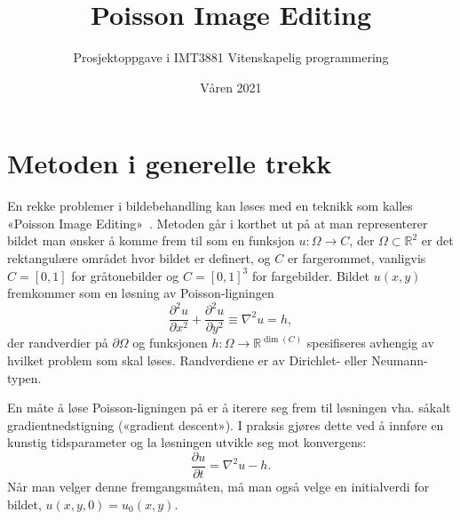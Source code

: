 \documentclass[11pt,a4paper]{article}
\begin{document}
\title{Poisson Image Editing}
\author{Prosjektoppgave i IMT3881 Vitenskapelig programmering}
\date{Våren 2021}

\maketitle

\section{Metoden i generelle trekk}

En rekke problemer i bildebehandling kan løses med en teknikk som kalles «Poisson Image Editing»~\cite{Perez:03}. Metoden går i korthet ut på at man representerer bildet man ønsker å komme frem til som en funksjon $u : \Omega \to C$, der $\Omega \subset \mathbb{R}^2$ er det rektangulære området hvor bildet er definert, og $C$ er fargerommet, vanligvis $C = [0, 1]$ for gråtonebilder og $C = [0, 1]^3$ for fargebilder. Bildet $u(x, y)$ fremkommer som en løsning av Poisson-ligningen
\begin{equation}
  \frac{\partial^2 u}{\partial x^2} + \frac{\partial^2 u}{\partial y^2} \equiv \nabla^2 u = h,
  \label{eq:poisson}
\end{equation}
der randverdier på $\partial\Omega$ og funksjonen $h : \Omega \to \mathbb{R}^{\dim(C)}$ spesifiseres avhengig av hvilket problem som skal løses. Randverdiene er av Dirichlet- eller Neumann-typen.

En måte å løse Poisson-ligningen på er å iterere seg frem til løsningen vha. såkalt gradientnedstigning («gradient descent»). I praksis gjøres dette ved å innføre en kunstig tidsparameter og la løsningen utvikle seg mot konvergens:
\begin{equation}
\frac{\partial u}{\partial t} = \nabla^2 u - h.
\label{eq:diffusjon}
\end{equation}
Når man velger denne fremgangsmåten, må man også velge en initialverdi for bildet, $u(x, y, 0) = u_0(x, y)$.
\end{document}

